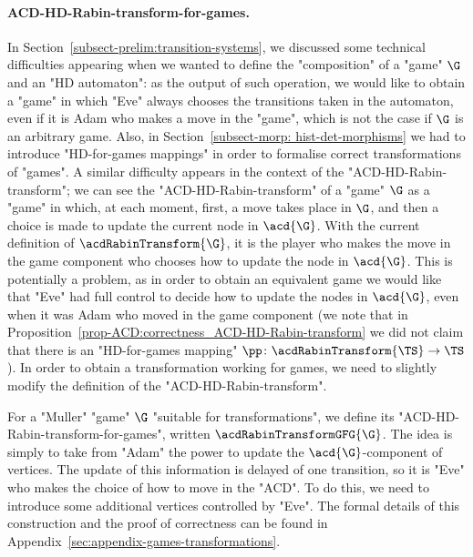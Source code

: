 \documentclass[10pt,a4paper]{amsart}
\begin{document}
\paragraph*{ACD-HD-Rabin-transform-for-games.}

In Section~\ref{subsect-prelim:transition-systems}, we discussed some technical difficulties appearing when we wanted to define the "composition" of a "game" $\G$ and an "HD automaton": as the output of such operation, we would like to obtain a "game" in which "Eve" always chooses the transitions taken in the automaton, even if it is Adam who makes a move in the "game", which is not the case if $\G$ is an arbitrary game. Also, in Section~\ref{subsect-morp: hist-det-morphisms} we had to introduce "HD-for-games mappings" in order to formalise correct transformations of "games".
A similar difficulty appears in the context of the "ACD-HD-Rabin-transform"; we can see the "ACD-HD-Rabin-transform" of a "game" $\G$ as a "game" in which, at each moment, first, a move takes place in $\G$, and then a choice is made to update the current node in $\acd{\G}$. With the current definition of $\acdRabinTransform{\G}$, it is the player who makes the move in the game component who chooses how to update the node in $\acd{\G}$. This is potentially a problem, as in order to obtain an equivalent game we would like that "Eve" had full control to decide how to update the nodes in $\acd{\G}$, even when it was Adam who moved in the game component (we note that in Proposition~\ref{prop-ACD:correctness_ACD-HD-Rabin-transform} we did not claim that there is an "HD-for-games mapping" $\pp\colon \acdRabinTransform{\TS} \to \TS$).
In order to obtain a transformation working for games, we need to slightly modify the definition of the "ACD-HD-Rabin-transform". 

\AP  For a "Muller" "game" $\G$ "suitable for transformations", we define its "ACD-HD-Rabin-transform-for-games", written $\acdRabinTransformGFG{\G}$. The idea is simply to take from "Adam" the power to update the $\acd{\G}$-component of vertices. 
The update of this information is delayed of one transition, so it is "Eve" who makes the choice of how to move in the "ACD".
To do this, we need to introduce some additional vertices controlled by "Eve".
The formal details of this construction and the proof of correctness can be found in Appendix~\ref{sec:appendix-games-transformations}.
\end{document}
